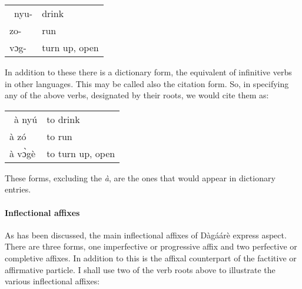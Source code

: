\begin{refsection}
\ea \begin{tabular}{ll}\  nyu- &drink\\
zo- & run \\
vɔg- & turn up, open\\
\end{tabular}
\z 


In addition to these there is a dictionary form, the equivalent of infinitive verbs in other
languages. This may be called also the citation form. So, in specifying any of the above
verbs, designated by their roots, we would cite them as:

\ea \begin{tabular}{ll}\  à nyú  &to drink\\
à zó & to run \\
à vɔ̀gè &to turn up, open\\
\end{tabular}
\z 


These forms, excluding the \textit{à}, are the ones that would appear in dictionary entries.

\paragraph{Inflectional affixes}
As has been discussed, the main inflectional affixes of Dàgáárè express aspect.
There are three forms, one imperfective or progressive affix and two perfective or completive
affixes. In addition to this is the affixal counterpart of the factitive or affirmative particle. I
shall use two of the verb roots above to illustrate the various inflectional affixes:

\ea {} 
\z\z


\end{refsection}
